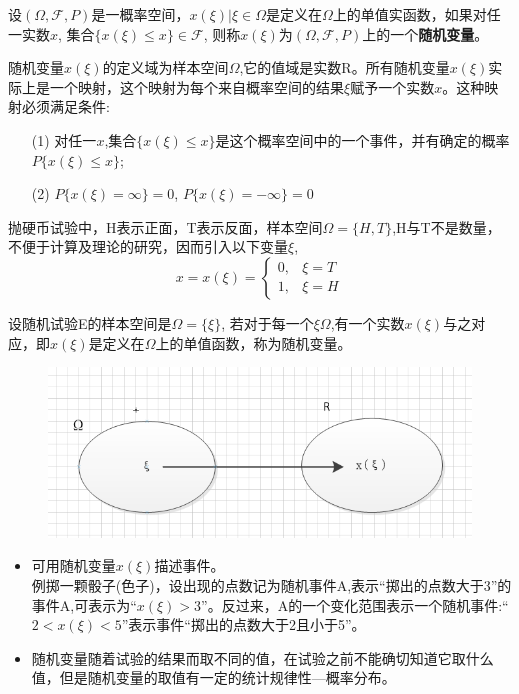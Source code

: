 \documentclass[xcolor=svgnames,serif,table,10pt]{beamer}
\begin{document}
\begin{frame}
\begin{definition}
	设$(\Omega,\mathcal{F},P)$是一概率空间，$x(\xi)|\xi\in\Omega$是定义在$\Omega$上的单值实函数，如果对任一实数$x$, 集合$\{x(\xi)\le x\}\in\mathcal{F}$, 则称$x(\xi)$为$(\Omega,\mathcal{F},P)$上的一个\textbf{随机变量}。
	
	随机变量$x(\xi)$的定义域为样本空间$\Omega$,它的值域是实数R。所有随机变量$x(\xi)$实际上是一个映射，这个映射为每个来自概率空间的结果$\xi$赋予一个实数$x$。这种映射必须满足条件:
	\begin{itemize}
		\item[(1)] 对任一$x$,集合$\{x(\xi)\le x\}$是这个概率空间中的一个事件，并有确定的概率$P\{x(\xi)\le x\}$;
		\item[(2)] $P\{x(\xi)=\infty \}=0$, $P\{x(\xi)=-\infty \}=0$
	\end{itemize}
\end{definition}
\end{frame}

\begin{frame}
\begin{example}
	抛硬币试验中，H表示正面，T表示反面，样本空间$\Omega=\{H,T\}$,H与T不是数量，不便于计算及理论的研究，因而引入以下变量$\xi$,
	$$x=x(\xi)=
	\begin{cases}
	0, &\xi=T\\
	1, &\xi=H
	\end{cases}
	$$
\end{example}  
\end{frame}

\begin{frame}
\begin{definition}
	设随机试验E的样本空间是$\Omega=\{\xi\}$, 若对于每一个$\xi\Omega$,有一个实数$x(\xi)$与之对应，即$x(\xi)$是定义在$\Omega$上的单值函数，称为随机变量。
\end{definition}
\begin{figure}[htbp]
	\includegraphics[scale=0.4]{xi_map}
\end{figure}
\begin{itemize}
	\item 可用随机变量$x(\xi)$描述事件。\\
	例掷一颗骰子(色子)，设出现的点数记为随机事件A,表示``掷出的点数大于3''的事件A,可表示为``$x(\xi)>3$''。反过来，A的一个变化范围表示一个随机事件:``$2<x(\xi)<5$''表示事件``掷出的点数大于2且小于5''。
	\item 随机变量随着试验的结果而取不同的值，在试验之前不能确切知道它取什么值，但是随机变量的取值有一定的统计规律性---概率分布。
\end{itemize}

\end{frame}
\end{document}

